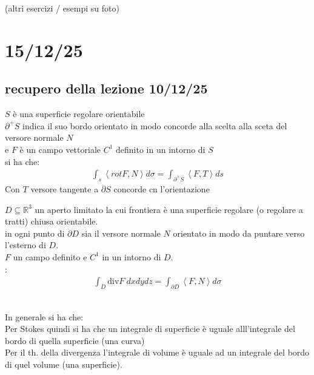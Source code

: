 \documentclass[a4paper, oneside]{article}
\begin{document}
(altri esercizi / esempi su foto)
    

\newpage
\section{15/12/25} 
\subsection{recupero della lezione 10/12/25}

\begin{theorem}
   $S$ è una superficie regolare orientabile\\
  $\partial^+ S$ indica il suo bordo orientato in modo concorde alla scelta alla sceta del versore normale $N$\\
  e $F$ è un campo vettoriale $C^1$ definito in un intorno di $S$\\
   si ha che:
  \begin{gather*}
    \int_s \left\langle rot F , N \right\rangle  d\sigma = \int_{\partial^+ S} \left\langle F , T \right\rangle ds
  \end{gather*}
  Con $T$ versore tangente a $\partial S$ concorde cn l'orientazione
\end{theorem}
\begin{theorem}
   $D \subseteq \mathbb{R}^3$ un aperto limitato la cui frontiera è una superficie regolare (o regolare a tratti) chiusa orientabile.\\
   in ogni punto di $\partial D$ sia il versore normale $N$ orientato in modo da puntare verso l'esterno di $D$.\\
   $F$ un campo definito e $C^1$ in un intorno di $D$.\\
  :
  \begin{gather*}
    \int_D  \text{div}F \ dxdydz = \int_{\partial D} \left\langle F , N \right\rangle d\sigma
  \end{gather*} 
\end{theorem}
\hfill\\
In generale si ha che:\\
Per Stokes quindi si ha che un integrale di superficie è uguale alll'integrale del bordo di quella superficie (una curva)\\
Per il th. della divergenza l'integrale di volume è uguale ad un integrale del bordo di quel volume (una superficie).\\
\end{document}
